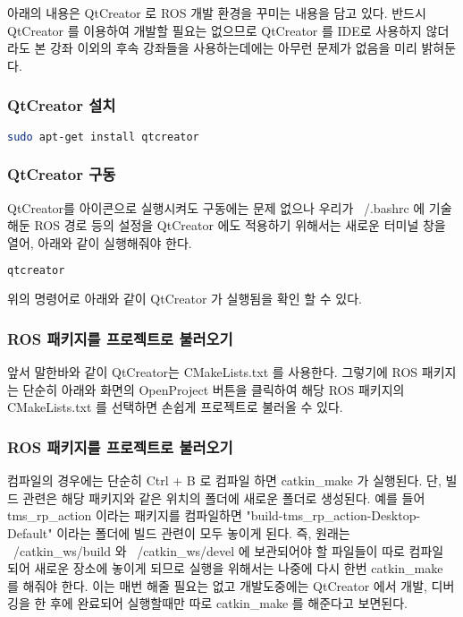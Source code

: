 아래의 내용은 QtCreator 로 ROS 개발 환경을 꾸미는 내용을 담고 있다. 반드시 QtCreator 를 이용하여 개발할 필요는 없으므로 QtCreator 를 IDE로 사용하지 않더라도 본 강좌 이외의 후속 강좌들을 사용하는데에는 아무런 문제가 없음을 미리 밝혀둔다.

\subsubsection{QtCreator 설치}

\begin{lstlisting}[language=bash]
sudo apt-get install qtcreator
\end{lstlisting}

\subsubsection{QtCreator 구동}
QtCreator를 아이콘으로 실행시켜도 구동에는 문제 없으나 우리가 ~/.bashrc 에 기술해둔 ROS 경로 등의 설정을 QtCreator 에도 적용하기 위해서는 새로운 터미널 창을 열어, 아래와 같이 실행해줘야 한다.

\begin{lstlisting}[language=bash]
qtcreator
\end{lstlisting}

\noindent
위의 명령어로 아래와 같이 QtCreator 가 실행됨을 확인 할 수 있다.

\subsubsection{ROS 패키지를 프로젝트로 불러오기}
앞서 말한바와 같이 QtCreator는 CMakeLists.txt 를 사용한다. 그렇기에 ROS 패키지는 단순히 아래와 화면의 OpenProject 버튼을 클릭하여 해당 ROS 패키지의 CMakeLists.txt 를 선택하면 손쉽게 프로젝트로 불러올 수 있다.

\subsubsection{ROS 패키지를 프로젝트로 불러오기}
컴파일의 경우에는 단순히 Ctrl + B 로 컴파일 하면 catkin\_make 가 실행된다. 단, 빌드 관련은 해당 패키지와 같은 위치의 폴더에 새로운 폴더로 생성된다. 예를 들어 tms\_rp\_action 이라는 패키지를 컴파일하면 "build-tms\_rp\_action-Desktop-Default" 이라는 폴더에 빌드 관련이 모두 놓이게 된다. 즉,  원래는 ~/catkin\_ws/build 와 ~/catkin\_ws/devel 에 보관되어야 할 파일들이 따로 컴파일 되어 새로운 장소에 놓이게 되므로 실행을 위해서는 나중에 다시 한번 catkin\_make 를 해줘야 한다. 이는 매번 해줄 필요는 없고 개발도중에는 QtCreator 에서 개발, 디버깅을 한 후에 완료되어 실행할때만 따로 catkin\_make 를 해준다고 보면된다. 

